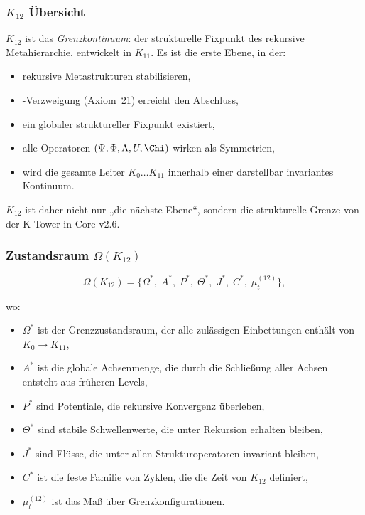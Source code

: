 

\subsubsection{$K_{12}$ Übersicht}
\label{sec:k12-overview}

$K_{12}$ ist das \emph{Grenzkontinuum}: der strukturelle Fixpunkt des
rekursive Metahierarchie, entwickelt in $K_{11}$.
Es ist die erste Ebene, in der:

\begin{itemize}
    \item rekursive Metastrukturen stabilisieren,
    \item-Verzweigung (Axiom~21) erreicht den Abschluss,
    \item ein globaler struktureller Fixpunkt existiert,
    \item alle Operatoren $(\Psi,\Phi,\Lambda,U,\Chi)$ wirken als Symmetrien,
    \item wird die gesamte Leiter $K_0\dots K_{11}$ innerhalb einer darstellbar
          invariantes Kontinuum.
\end{itemize}

$K_{12}$ ist daher nicht nur „die nächste Ebene“, sondern die strukturelle Grenze von
der K-Tower in Core v2.6.

\subsubsection{Zustandsraum $\Omega(K_{12})$}

\[
\Omega(K_{12}) =
\{
\Omega^*,\;
A^*,\;
P^*,\;
\Theta^*,\;
J^*,\;
C^*,\;
\mu^{(12)}_t
\},
\]

wo:
\begin{itemize}
    \item $\Omega^*$ ist der Grenzzustandsraum, der alle zulässigen Einbettungen enthält
          von $K_0\!\to\!K_{11}$,
    \item $A^*$ ist die globale Achsenmenge, die durch die Schließung aller Achsen entsteht
          aus früheren Levels,
    \item $P^*$ sind Potentiale, die rekursive Konvergenz überleben,
    \item $\Theta^*$ sind stabile Schwellenwerte, die unter Rekursion erhalten bleiben,
    \item $J^*$ sind Flüsse, die unter allen Strukturoperatoren invariant bleiben,
    \item $C^*$ ist die feste Familie von Zyklen, die die Zeit von $K_{12}$ definiert,
    \item $\mu^{(12)}_t$ ist das Maß über Grenzkonfigurationen.
\end{itemize}

